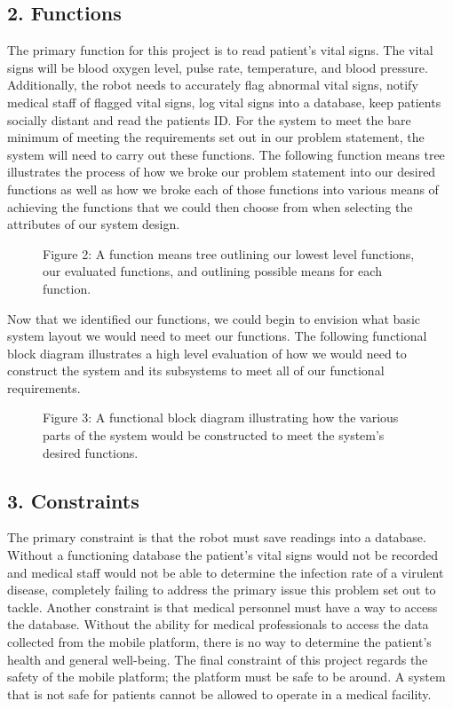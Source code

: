 ﻿\documentclass[10pt]{article}
\begin{document}
\subsection{2. Functions}
        The primary function for this project is to read patient’s vital signs. The vital signs will be blood oxygen level, pulse rate, temperature, and blood pressure. Additionally, the robot needs to accurately flag abnormal vital signs, notify medical staff of flagged vital signs, log vital signs into a database, keep patients socially distant and read the patients ID. For the system to meet the bare minimum of meeting the requirements set out in our problem statement, the system will need to carry out these functions. The following function means tree illustrates the process of how we broke our problem statement into our desired functions as well as how we broke each of those functions into various means of achieving the functions that we could then choose from when selecting the attributes of our system design.
\begin{figure}
\caption{Figure 2: A function means tree outlining our lowest level functions, our evaluated functions, and outlining possible means for each function.}
\label{fig:2}
\end{figure}

Now that we identified our functions, we could begin to envision what basic system layout we would need to meet our functions. The following functional block diagram illustrates a high level evaluation of how we would need to construct the system and its subsystems to meet all of our functional requirements. 
\begin{figure}
\caption{Figure 3: A functional block diagram illustrating how the various parts of the system would be constructed to meet the system’s desired functions.}
\label{fig:3}
\end{figure}

\subsection{3. Constraints}
The primary constraint is that the robot must save readings into a database. Without a functioning database the patient’s vital signs would not be recorded and medical staff would not be able to determine the infection rate of a virulent disease, completely failing to address the primary issue this problem set out to tackle. Another constraint is that medical personnel must have a way to access the database. Without the ability for medical professionals to access the data collected from the mobile platform, there is no way to determine the patient’s health and general well-being. The final constraint of this project regards the safety of  the mobile platform; the platform must be safe to be around. A system that is not safe for patients cannot be allowed to operate in a medical facility.
\end{document}
